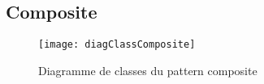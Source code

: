 \subsection{Composite}
\begin{figure}[h]
\begin{center}
    \texttt{[image: diagClassComposite]}
\end{center}
    \caption{Diagramme de classes du pattern composite}
    \label{classes-composite}
\end{figure}
